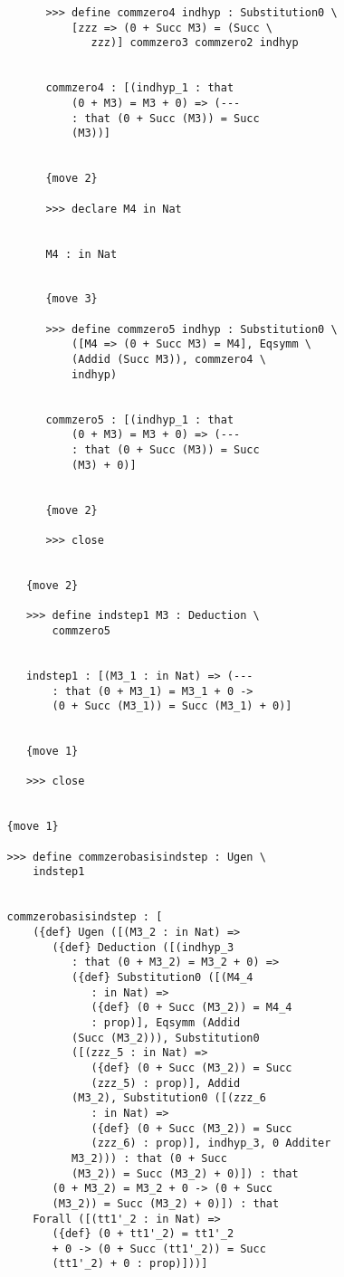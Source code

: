 \documentclass[12pt]{article}
\begin{document}
\begin{verbatim}
         >>> define commzero4 indhyp : Substitution0 \
             [zzz => (0 + Succ M3) = (Succ \
                zzz)] commzero3 commzero2 indhyp


         commzero4 : [(indhyp_1 : that 
             (0 + M3) = M3 + 0) => (--- 
             : that (0 + Succ (M3)) = Succ 
             (M3))]


         {move 2}

         >>> declare M4 in Nat


         M4 : in Nat


         {move 3}

         >>> define commzero5 indhyp : Substitution0 \
             ([M4 => (0 + Succ M3) = M4], Eqsymm \
             (Addid (Succ M3)), commzero4 \
             indhyp)


         commzero5 : [(indhyp_1 : that 
             (0 + M3) = M3 + 0) => (--- 
             : that (0 + Succ (M3)) = Succ 
             (M3) + 0)]


         {move 2}

         >>> close


      {move 2}

      >>> define indstep1 M3 : Deduction \
          commzero5


      indstep1 : [(M3_1 : in Nat) => (--- 
          : that (0 + M3_1) = M3_1 + 0 -> 
          (0 + Succ (M3_1)) = Succ (M3_1) + 0)]


      {move 1}

      >>> close


   {move 1}

   >>> define commzerobasisindstep : Ugen \
       indstep1


   commzerobasisindstep : [
       ({def} Ugen ([(M3_2 : in Nat) => 
          ({def} Deduction ([(indhyp_3 
             : that (0 + M3_2) = M3_2 + 0) => 
             ({def} Substitution0 ([(M4_4 
                : in Nat) => 
                ({def} (0 + Succ (M3_2)) = M4_4 
                : prop)], Eqsymm (Addid 
             (Succ (M3_2))), Substitution0 
             ([(zzz_5 : in Nat) => 
                ({def} (0 + Succ (M3_2)) = Succ 
                (zzz_5) : prop)], Addid 
             (M3_2), Substitution0 ([(zzz_6 
                : in Nat) => 
                ({def} (0 + Succ (M3_2)) = Succ 
                (zzz_6) : prop)], indhyp_3, 0 Additer 
             M3_2))) : that (0 + Succ 
             (M3_2)) = Succ (M3_2) + 0)]) : that 
          (0 + M3_2) = M3_2 + 0 -> (0 + Succ 
          (M3_2)) = Succ (M3_2) + 0)]) : that 
       Forall ([(tt1'_2 : in Nat) => 
          ({def} (0 + tt1'_2) = tt1'_2 
          + 0 -> (0 + Succ (tt1'_2)) = Succ 
          (tt1'_2) + 0 : prop)]))]



\end{verbatim}
\end{document}
